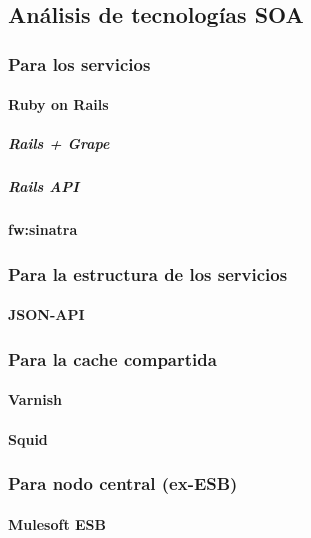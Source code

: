 \subsection{Análisis de tecnologías SOA}


\subsubsection{Para los servicios}

\paragraph{Ruby on Rails}

\subparagraph{Rails + Grape}
\subparagraph{Rails API}

\paragraph{\gls{fw:sinatra}}


\subsubsection{Para la estructura de los servicios}

\paragraph{JSON-API}


\subsubsection{Para la cache compartida}

\paragraph{Varnish}
\paragraph{Squid}


\subsubsection{Para nodo central (ex-ESB)}

\paragraph{Mulesoft ESB}

